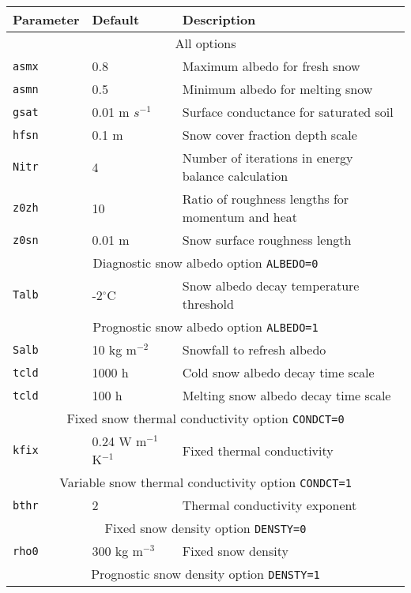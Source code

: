 \documentclass{article}
\begin{document}
\begin{tabular}{|l|l|l|}
\hline
Parameter & Default & Description \\
\hline
\hline 
\multicolumn{3}{|c|}{All options} \\
\hline 
{\tt asmx} & 0.8    & Maximum albedo for fresh snow                      \\
{\tt asmn} & 0.5    & Minimum albedo for melting snow                    \\
{\tt gsat} & 0.01 m $s^{-1}$ & Surface conductance for saturated soil    \\
{\tt hfsn} & 0.1 m  & Snow cover fraction depth scale                    \\
{\tt Nitr} & 4      & Number of iterations in energy balance calculation \\
{\tt z0zh} & 10     & Ratio of roughness lengths for momentum and heat   \\
{\tt z0sn} & 0.01 m & Snow surface roughness length                      \\
\hline 
\hline 
\multicolumn{3}{|c|}{Diagnostic snow albedo option {\tt ALBEDO=0}} \\
\hline 
{\tt Talb} & -2$^\circ$C & Snow albedo decay temperature threshold  \\
\hline 
\hline 
\multicolumn{3}{|c|}{Prognostic snow albedo option {\tt ALBEDO=1}} \\
\hline 
{\tt Salb} & 10 kg m$^{-2}$ & Snowfall to refresh albedo           \\
{\tt tcld} & 1000 h         & Cold snow albedo decay time scale    \\
{\tt tcld} & 100 h          & Melting snow albedo decay time scale \\
\hline 
\hline 
\multicolumn{3}{|c|}{Fixed snow thermal conductivity option {\tt CONDCT=0}}    \\
\hline 
{\tt kfix} & 0.24 W m$^{-1}$ K$^{-1}$ & Fixed thermal conductivity               \\
\hline
\hline 
\multicolumn{3}{|c|}{Variable snow thermal conductivity option {\tt CONDCT=1}} \\
\hline 
{\tt bthr} & 2 & Thermal conductivity exponent                                   \\
\hline
\hline 
\multicolumn{3}{|c|}{Fixed snow density option {\tt DENSTY=0}} \\
\hline 
{\tt rho0} & 300 kg m$^{-3}$ & Fixed snow density \\
\hline
\hline 
\multicolumn{3}{|c|}{Prognostic snow density option {\tt DENSTY=1}} \\

\end{tabular}
\end{document}
